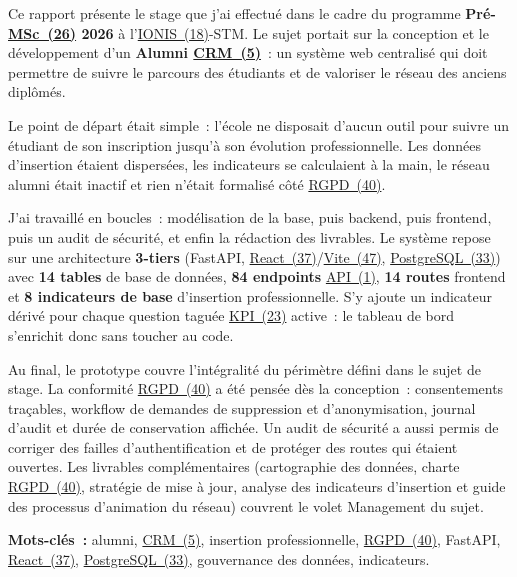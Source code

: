 \documentclass[12pt,a4paper]{report}
\begin{document}
\begin{tcolorbox}[
  colback=white, colframe=axonbase, colbacktitle=axonbase,
  coltitle=white, title={Résumé}, fonttitle=\bfseries\sffamily,
  arc=4pt, boxrule=0.8pt, left=14pt, right=14pt, top=10pt, bottom=10pt
]
\sffamily
Ce rapport présente le stage que j'ai effectué dans le cadre du programme \textbf{Pré-\hyperlink{abbr-MSc}{MSc~(26)} 2026} à l'\hyperlink{abbr-IONIS}{IONIS~(18)}-STM. Le sujet portait sur la conception et le développement d'un \textbf{Alumni \hyperlink{abbr-CRM}{CRM~(5)}}~: un système web centralisé qui doit permettre de suivre le parcours des étudiants et de valoriser le réseau des anciens diplômés.

\medskip
Le point de départ était simple~: l'école ne disposait d'aucun outil pour suivre un étudiant de son inscription jusqu'à son évolution professionnelle. Les données d'insertion étaient dispersées, les indicateurs se calculaient à la main, le réseau alumni était inactif et rien n'était formalisé côté \hyperlink{abbr-RGPD}{RGPD~(40)}.

\medskip
J'ai travaillé en boucles~: modélisation de la base, puis backend, puis frontend, puis un audit de sécurité, et enfin la rédaction des livrables. Le système repose sur une architecture \textbf{3-tiers} (FastAPI, \hyperlink{abbr-React}{React~(37)}/\hyperlink{abbr-Vite}{Vite~(47)}, \hyperlink{abbr-PostgreSQL}{PostgreSQL~(33)}) avec \textbf{14 tables} de base de données, \textbf{84 endpoints} \hyperlink{abbr-API}{API~(1)}, \textbf{14 routes} frontend et \textbf{8 indicateurs de base} d'insertion professionnelle. S'y ajoute un indicateur dérivé pour chaque question taguée \hyperlink{abbr-KPI}{KPI~(23)} active~: le tableau de bord s'enrichit donc sans toucher au code.

\medskip
Au final, le prototype couvre l'intégralité du périmètre défini dans le sujet de stage. La conformité \hyperlink{abbr-RGPD}{RGPD~(40)} a été pensée dès la conception~: consentements traçables, workflow de demandes de suppression et d'anonymisation, journal d'audit et durée de conservation affichée. Un audit de sécurité a aussi permis de corriger des failles d'authentification et de protéger des routes qui étaient ouvertes. Les livrables complémentaires (cartographie des données, charte \hyperlink{abbr-RGPD}{RGPD~(40)}, stratégie de mise à jour, analyse des indicateurs d'insertion et guide des processus d'animation du réseau) couvrent le volet Management du sujet.
\end{tcolorbox}

\begin{tcolorbox}[
  colback=axonlight, colframe=axongray, arc=4pt, boxrule=0.8pt,
  left=12pt, right=12pt, top=8pt, bottom=8pt
]
\noindent\textbf{Mots-clés~:} alumni, \hyperlink{abbr-CRM}{CRM~(5)}, insertion professionnelle, \hyperlink{abbr-RGPD}{RGPD~(40)}, FastAPI, \hyperlink{abbr-React}{React~(37)}, \hyperlink{abbr-PostgreSQL}{PostgreSQL~(33)}, gouvernance des données, indicateurs.
\end{tcolorbox}
\end{document}
